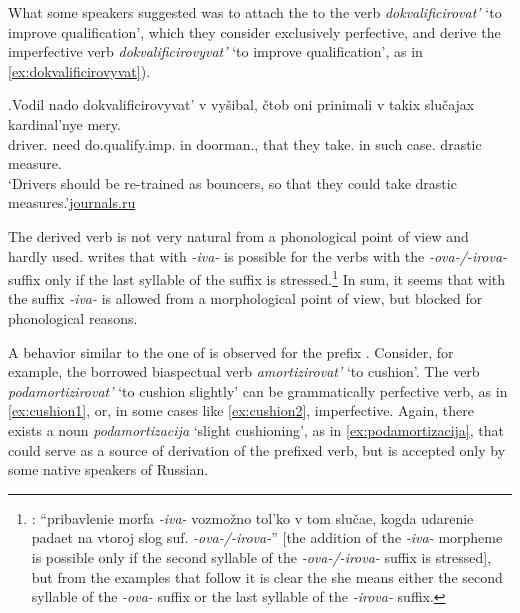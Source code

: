 What some speakers suggested was to attach the  to the verb \textit{dokvalificirovat'} `to improve qualification', which they consider exclusively perfective, and derive the imperfective verb \textit{dokvalificirovyvat'} `to improve qualification', as in \ref{ex:dokvalificirovyvat}). 

\exg.\label{ex:dokvalificirovyvat}Vodil nado dokvalificirovyvat' v vy\v{s}ibal, \v{c}tob oni prinimali v takix slu\v{c}ajax kardinal'nye mery.\\
driver. need do.qualify.imp. in doorman., that they take. in such case. drastic measure.\\
\trans `Drivers should be re-trained as bouncers, so that they could take drastic measures.'\hbox{}\hfill\hbox{\url{journals.ru}}

The derived verb is not very natural from a phonological point of view and hardly used. \citet[590]{Shvedova:82} writes that  with \textit{-iva-} is possible for the verbs with the \textit{-ova-/-irova-} suffix only if the last syllable of the suffix is stressed.\footnote{\citet[590]{Shvedova:82}: ``pribavlenie morfa \textit{-­iva-} vozmo\v{z}no tol'ko v tom slu\v{c}ae, kogda udarenie padaet na vtoroj slog suf. \textit{-­ova-/-irova-}'' [the addition of the \textit{-iva-} morpheme is possible only if the second syllable of the \textit{-­ova-/-irova-} suffix is stressed], but from the examples that follow it is clear the she means either the second syllable of the \textit{-ova-} suffix or the last syllable of the \textit{-irova-} suffix.} In sum, it seems that  with the suffix \textit{-iva-} is allowed from a morphological point of view, but blocked for phonological reasons.
 
A behavior similar to the one of  is observed for the prefix . Consider, for example, the borrowed biaspectual verb \textit{amortizirovat'} `to cushion'. The verb \textit{podamortizirovat'} `to cushion slightly' can be grammatically perfective verb, as in \ref{ex:cushion1}, or, in some cases like \ref{ex:cushion2}, imperfective. Again, there exists a noun \textit{podamortizacija} `slight cushioning', as in \ref{ex:podamortizacija}, that could serve as a source of derivation of the prefixed verb, but is accepted only by some native speakers of Russian.

